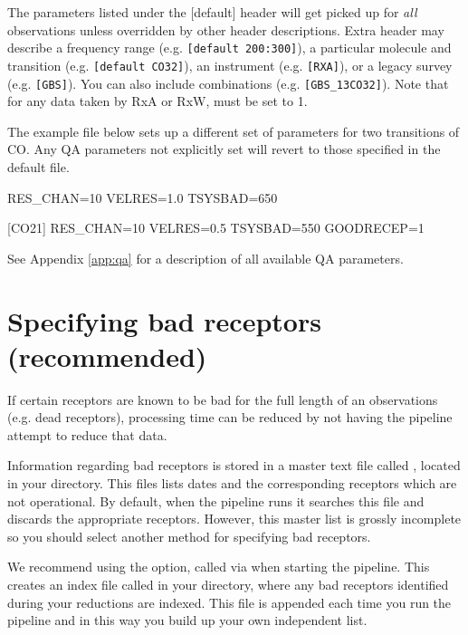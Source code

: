 \documentclass[11pt,oneside,chapters]{starlink}
\begin{document}
The parameters listed under the [default] header will get picked up
for \textit{all} observations unless overridden by other header
descriptions. Extra header may describe a frequency range (e.g.
\texttt{[default 200:300]}), a particular molecule and transition
(e.g. \texttt{[default CO32]}), an instrument (e.g. \texttt{[RXA]}),
or a legacy survey (e.g. \texttt{[GBS]}). You can also include
combinations (e.g. \texttt{[GBS\_13CO32]}). Note that for any data
taken by RxA or RxW,  must be set to 1.

The example file below sets up a different set of parameters for two
transitions of CO. Any QA parameters not explicitly set will revert to
those specified in the default  file.

\begin{center}
\vspace{0.2cm}
\begin{terminalv}
[C18O32]
RES_CHAN=10
VELRES=1.0
TSYSBAD=650

[CO21]
RES_CHAN=10
VELRES=0.5
TSYSBAD=550
GOODRECEP=1
\end{terminalv}
\end{center}

See Appendix \ref{app:qa} for a description of all available QA parameters.


\section{Specifying bad receptors (recommended)}
\label{sec:badrec}

If certain receptors are known to be bad for the full length of an
observations (e.g. dead receptors), processing time can be reduced by
not having the pipeline attempt to reduce that data.

Information regarding bad receptors is stored in a master text file
called , located in your
 directory. This files lists dates and the
corresponding receptors which are not operational. By default, when
the pipeline runs it searches this file and discards the appropriate
receptors. However, this master list is grossly incomplete so you
should select another method for specifying bad receptors.

We recommend using the  option, called via  when starting the pipeline. This creates an
index file called  in your
 directory, where any bad receptors identified
during your reductions are indexed. This file is appended each time
you run the pipeline and in this way you build up your own independent
list.
\end{document}

